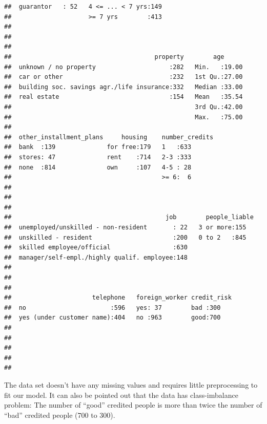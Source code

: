 \documentclass[
]{article}
\begin{document}
\begin{verbatim}
##  guarantor   : 52   4 <= ... < 7 yrs:149    
##                     >= 7 yrs        :413    
##                                             
##                                             
##                                             
##                                       property        age       
##  unknown / no property                    :282   Min.   :19.00  
##  car or other                             :232   1st Qu.:27.00  
##  building soc. savings agr./life insurance:332   Median :33.00  
##  real estate                              :154   Mean   :35.54  
##                                                  3rd Qu.:42.00  
##                                                  Max.   :75.00  
##                                                                 
##  other_installment_plans     housing    number_credits
##  bank  :139              for free:179   1   :633      
##  stores: 47              rent    :714   2-3 :333      
##  none  :814              own     :107   4-5 : 28      
##                                         >= 6:  6      
##                                                       
##                                                       
##                                                       
##                                          job        people_liable
##  unemployed/unskilled - non-resident       : 22   3 or more:155  
##  unskilled - resident                      :200   0 to 2   :845  
##  skilled employee/official                 :630                  
##  manager/self-empl./highly qualif. employee:148                  
##                                                                  
##                                                                  
##                                                                  
##                      telephone   foreign_worker credit_risk
##  no                       :596   yes: 37        bad :300   
##  yes (under customer name):404   no :963        good:700   
##                                                            
##                                                            
##                                                            
##                                                            
## 
\end{verbatim}

The data set doesn't have any missing values and requires little preprocessing to fit our model. It can also be pointed out that the data has class-imbalance problem: The number of ``good'' credited people is more than twice the number of ``bad'' credited people (700 to 300).
\end{document}
